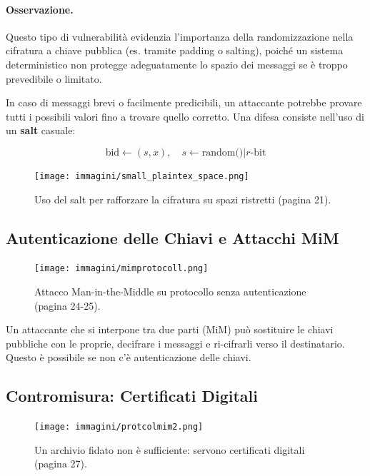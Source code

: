 \documentclass{report}
\begin{document}
\paragraph{Osservazione.} Questo tipo di vulnerabilità evidenzia l'importanza della randomizzazione nella cifratura a chiave pubblica (es. tramite padding o salting), poiché un sistema deterministico non protegge adeguatamente lo spazio dei messaggi se è troppo prevedibile o limitato.



In caso di messaggi brevi o facilmente predicibili, un attaccante potrebbe provare tutti i possibili valori fino a trovare quello corretto. Una difesa consiste nell'uso di un \textbf{salt} casuale:

\begin{equation}
\text{bid} \leftarrow (s, x), \quad s \leftarrow \text{random()}|r\text{-bit}
\end{equation}

\begin{figure}[h]
    \centering
    \texttt{[image: immagini/small\_plaintex\_space.png]}
    \caption{Uso del salt per rafforzare la cifratura su spazi ristretti (pagina 21).}
    \label{fig:salt}
\end{figure}

\subsection{Autenticazione delle Chiavi e Attacchi MiM}

\begin{figure}[h]
    \centering
    \texttt{[image: immagini/mimprotocoll.png]}
    \caption{Attacco Man-in-the-Middle su protocollo senza autenticazione (pagina 24-25).}
    \label{fig:mim_attack}
\end{figure}

Un attaccante che si interpone tra due parti (MiM) pu\`o sostituire le chiavi pubbliche con le proprie, decifrare i messaggi e ri-cifrarli verso il destinatario. Questo \`e possibile se non c'\`e autenticazione delle chiavi.

\subsection{Contromisura: Certificati Digitali}

\begin{figure}[h]
    \centering
    \texttt{[image: immagini/protcolmim2.png]}
    \caption{Un archivio fidato non \`e sufficiente: servono certificati digitali (pagina 27).}
    \label{fig:certificates}
\end{figure}
\end{document}
